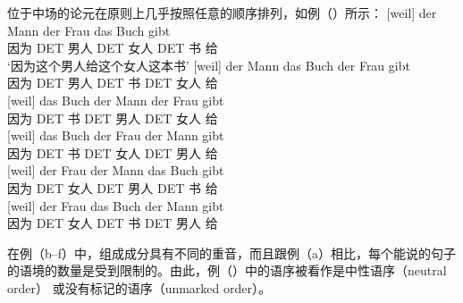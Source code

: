位于中场的论元在原则上几乎按照任意的顺序排列，如例（）所示：
\eal
\label{ex-gb-umstellung}
\ex 
\gll {}[weil] der Mann der Frau das Buch gibt\\
     \spacebr{}因为 DET 男人 DET 女人 DET 书 给\\
\glt `因为这个男人给这个女人这本书'
\ex 
\gll {}[weil] der Mann das Buch der Frau gibt\\
     \spacebr{}因为 DET 男人 DET 书 DET 女人 给\\
\ex\label{ex-das-buch-der-mann-der-frau-gibt} 
\gll {}[weil] das Buch der Mann der Frau gibt\\
     \spacebr{}因为 DET 书 DET 男人 DET 女人 给\\
\ex 
\gll {}[weil] das Buch der Frau der Mann gibt\\
     \spacebr{}因为 DET 书 DET 女人 DET 男人 给\\
\ex 
\gll {}[weil] der Frau der Mann das Buch gibt\\
     \spacebr{}因为 DET 女人 DET 男人 DET 书 给\\
\ex 
\gll {}[weil] der Frau das Buch der Mann gibt\\
     \spacebr{}因为 DET 女人 DET 书 DET 男人 给\\
\zl

\noindent
在例（b--f）中，组成成分具有不同的重音，而且跟例（a）相比，每个能说的句子的语境的数量是受到限制的\citep{Hoehle82}。由此，例（）中的语序被看作是中性语序（neutral order） 或没有标记的语序（unmarked order）。

